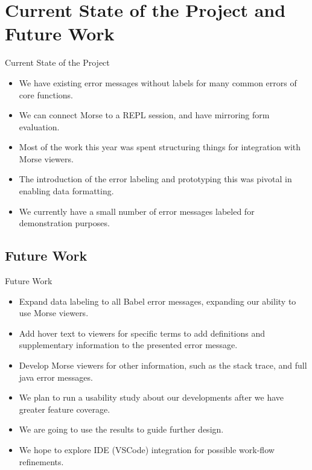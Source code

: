 \documentclass{beamer}
\begin{document}
\section{Current State of the Project and Future Work}
\begin{frame}{Current State of the Project}
  \begin{itemize}
    \item<1-> We have existing error messages without labels for many common errors of core functions.
    \item<2-> We can connect Morse to a REPL session, and have mirroring form evaluation.
    \item<3-> Most of the work this year was spent structuring things for integration with Morse viewers.
    \item<4-> The introduction of the error labeling and prototyping this was pivotal in enabling data formatting.
    \item<5-> We currently have a small number of error messages labeled for demonstration purposes.
  \end{itemize}
\end{frame}

\subsection{Future Work}
\begin{frame}{Future Work}
  \begin{itemize}
    \item<1-> Expand data labeling to all Babel error messages, expanding our ability to use Morse viewers.
    \item<2-> Add hover text to viewers for specific terms to add definitions and supplementary information to the presented error message.
    \item<3-> Develop Morse viewers for other information, such as the stack trace, and full java error messages.
    \item<4-> We plan to run a usability study about our developments after we have greater feature coverage.
    \item<5-> We are going to use the results to guide further design.
    \item<6-> We hope to explore IDE (VSCode) integration for possible work-flow refinements.
  \end{itemize}
  \end{frame}
\end{document}
